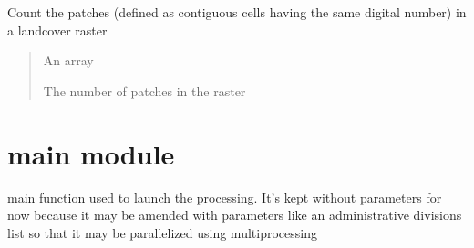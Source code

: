 \documentclass[letterpaper,10pt,english]{article}
\begin{document}
\begin{fulllineitems}
\label{\detokenize{indexes_func:indexes_func.count_landcover_patches}}
\pysigstartsignatures
{}
\pysigstopsignatures
\sphinxAtStartPar
Count the patches (defined as contiguous cells having the same digital number) in a landcover raster
\begin{quote}\begin{description}
\sphinxAtStartPar
{} \textendash{} An array

\sphinxAtStartPar
The number of patches in the raster

\end{description}\end{quote}

\end{fulllineitems}


\sphinxstepscope


\section{main module}
\label{\detokenize{main:module-main}}\label{\detokenize{main:main-module}}\label{\detokenize{main::doc}}

\begin{fulllineitems}
\label{\detokenize{main:main.main}}
\pysigstartsignatures
{}
\pysigstopsignatures
\sphinxAtStartPar
main function used to launch the processing. It’s kept without parameters for now because it may be
amended with parameters like an administrative divisions list so that it may be parallelized using multiprocessing

\end{fulllineitems}



\renewcommand{\indexname}{Python Module Index}
\begin{sphinxtheindex}
\let\bigletter\sphinxstyleindexlettergroup
\bigletter{c}
\item\relax{}
\indexspace
\bigletter{i}
\item\relax{}
\indexspace
\bigletter{m}
\item\relax{}
\end{sphinxtheindex}

\renewcommand{\indexname}{Index}
\printindex
\end{document}
